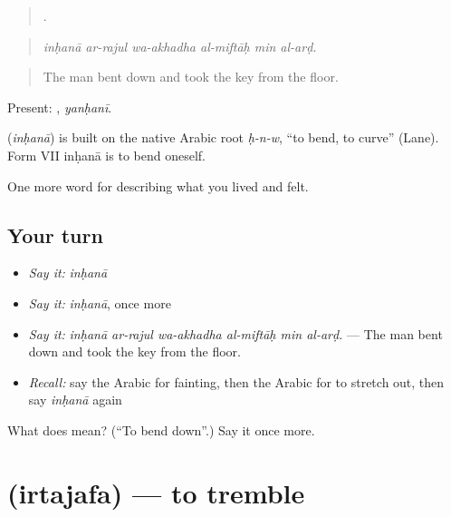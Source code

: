 \begin{quote}
     .
\end{quote}

\begin{quote}
\emph{inḥanā ar-rajul wa-akhadha al-miftāḥ min al-arḍ.}
\end{quote}

\begin{quote}
The man bent down and took the key from the floor.
\end{quote}

Present: , \emph{yanḥanī}.

\begin{cousinweb}
\textbf{} (\emph{inḥanā}) is built on the native Arabic root \emph{ḥ-n-w}, \textquotedblleft{}to bend, to curve\textquotedblright{} (Lane). Form VII inḥanā is to bend oneself.
\end{cousinweb}

\begin{grammarlens}[title={What you've built}]
One more word for describing what you lived and felt.
\end{grammarlens}

\subsection*{Your turn}
\begin{itemize}
\raggedright
  \item \emph{Say it:} \emph{inḥanā}
  \item \emph{Say it:} \emph{inḥanā}, once more
  \item \emph{Say it:} \emph{inḥanā ar-rajul wa-akhadha al-miftāḥ min al-arḍ.} — The man bent down and took the key from the floor.
  \item \emph{Recall:} say the Arabic for fainting, then the Arabic for to stretch out, then say \emph{inḥanā} again
\end{itemize}

\begin{tcolorbox}[breakable,colback=teal!4,colframe=teal!35!black,title={Before you move on}]
What does  mean? (\textquotedblleft{}To bend down\textquotedblright{}.) Say it once more.
\end{tcolorbox}
\section[\texorpdfstring{\ar{ارتجف} (irtajafa)}{ارتجف (irtajafa)}]{ (irtajafa) — to tremble}

